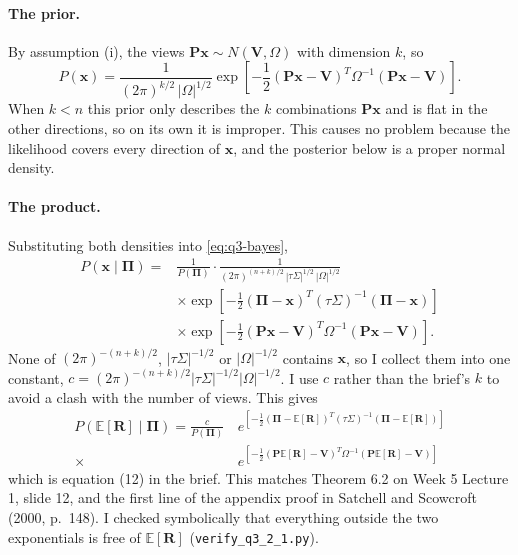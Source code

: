 \documentclass[11pt]{article}
\numberwithin{equation}{section}
\begin{document}
\paragraph{The prior.}
By assumption (i), the views $\bm{P}\bm{x} \sim N(\bm{V}, \Omega)$ with dimension $k$, so
\begin{equation*}
  P\left(\bm{x}\right) = \frac{1}{(2\pi)^{k/2}\,|\Omega|^{1/2}}\exp\left[-\frac{1}{2}\left(\bm{P}\bm{x} - \bm{V}\right)^{T}\Omega^{-1}\left(\bm{P}\bm{x} - \bm{V}\right)\right].
\end{equation*}
When $k < n$ this prior only describes the $k$ combinations $\bm{P}\bm{x}$ and is flat in the other directions, so on its own it is improper. This causes no problem because the likelihood covers every direction of $\bm{x}$, and the posterior below is a proper normal density.

\paragraph{The product.}
Substituting both densities into \eqref{eq:q3-bayes},
\begin{align*}
  P\left(\bm{x} \mid \bm{\Pi}\right) = {} & \frac{1}{P(\bm{\Pi})}\cdot\frac{1}{(2\pi)^{(n+k)/2}\,|\tau\Sigma|^{1/2}\,|\Omega|^{1/2}} \\
  & \times \exp\left[-\frac{1}{2}\left(\bm{\Pi} - \bm{x}\right)^{T}(\tau\Sigma)^{-1}\left(\bm{\Pi} - \bm{x}\right)\right] \\
  & \times \exp\left[-\frac{1}{2}\left(\bm{P}\bm{x} - \bm{V}\right)^{T}\Omega^{-1}\left(\bm{P}\bm{x} - \bm{V}\right)\right].
\end{align*}
None of $(2\pi)^{-(n+k)/2}$, $|\tau\Sigma|^{-1/2}$ or $|\Omega|^{-1/2}$ contains $\bm{x}$, so I collect them into one constant,
$c = (2\pi)^{-(n+k)/2}|\tau\Sigma|^{-1/2}|\Omega|^{-1/2}$. I use $c$ rather than the brief's $k$ to avoid a clash with the number of views. This gives
\begin{equation}
  \boxed{\;\begin{aligned}
  P\left(\mathbb{E}[\bm{R}] \mid \bm{\Pi}\right) = \frac{c}{P(\bm{\Pi})}\,
  & e^{\left[-\frac{1}{2}\left(\bm{\Pi} - \mathbb{E}[\bm{R}]\right)^{T}(\tau\Sigma)^{-1}\left(\bm{\Pi} - \mathbb{E}[\bm{R}]\right)\right]} \\
  \times\, & e^{\left[-\frac{1}{2}\left(\bm{P}\mathbb{E}[\bm{R}] - \bm{V}\right)^{T}\Omega^{-1}\left(\bm{P}\mathbb{E}[\bm{R}] - \bm{V}\right)\right]}
  \end{aligned}\;}
  \label{eq:q3-posterior}
\end{equation}
which is equation (12) in the brief. This matches Theorem 6.2 on Week 5 Lecture 1, slide 12, and the first line of the appendix proof in Satchell and Scowcroft (2000, p.~148). I checked symbolically that everything outside the two exponentials is free of $\mathbb{E}[\bm{R}]$ (\texttt{verify\_q3\_2\_1.py}).
\end{document}
